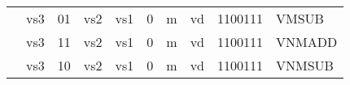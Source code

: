 \begin{table}[p]
\begin{small}
\begin{center}
\begin{tabular}{p{0in}p{0.4in}p{0.1in}p{0.3in}p{0.5in}p{0.5in}p{0.1in}p{0.3in}p{0.5in}p{0.7in}l}
&
\multicolumn{2}{|c|}{vs3} &
\multicolumn{1}{c|}{01} &
\multicolumn{1}{c|}{vs2} &
\multicolumn{1}{c|}{vs1} &
\multicolumn{1}{c|}{0} &
\multicolumn{1}{c|}{m} &
\multicolumn{1}{c|}{vd} &
\multicolumn{1}{c|}{1100111} & VMSUB \\
\cline{2-10}
  

&
\multicolumn{2}{|c|}{vs3} &
\multicolumn{1}{c|}{11} &
\multicolumn{1}{c|}{vs2} &
\multicolumn{1}{c|}{vs1} &
\multicolumn{1}{c|}{0} &
\multicolumn{1}{c|}{m} &
\multicolumn{1}{c|}{vd} &
\multicolumn{1}{c|}{1100111} & VNMADD \\
\cline{2-10}
  

&
\multicolumn{2}{|c|}{vs3} &
\multicolumn{1}{c|}{10} &
\multicolumn{1}{c|}{vs2} &
\multicolumn{1}{c|}{vs1} &
\multicolumn{1}{c|}{0} &
\multicolumn{1}{c|}{m} &
\multicolumn{1}{c|}{vd} &
\multicolumn{1}{c|}{1100111} & VNMSUB \\
\cline{2-10}
  

\end{tabular}
\end{center}
\end{small}

\end{table}
  

\newpage

